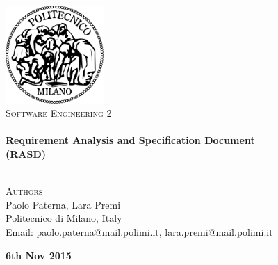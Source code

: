 \begin{titlepage}
\begin{center}


~\\[1cm]
\includegraphics[width=0.28\textwidth]{./logo-polimi}~\\[1.5cm]

\textsc{\huge \textsc{Software Engineering 2}
}
\\[1cm]

\HRule \\[0.4cm]
{ \huge \bfseries Requirement Analysis and Specification Document\\
		(RASD) \\[0.3cm]
		}
\HRule \\[1.5cm]

\noindent
\begin{minipage}{1.0\textwidth}
\begin{center}


\textsc{\large{Authors}} \\
\large{
Paolo Paterna, Lara Premi \\
\vspace{0.8cm}
\small{
Politecnico di Milano, Italy\\
Email: paolo.paterna@mail.polimi.it, lara.premi@mail.polimi.it
}
}

\end{center}
\end{minipage}%

\vfill
\textbf{\large{6th Nov 2015}}

\end{center}
\end{titlepage}